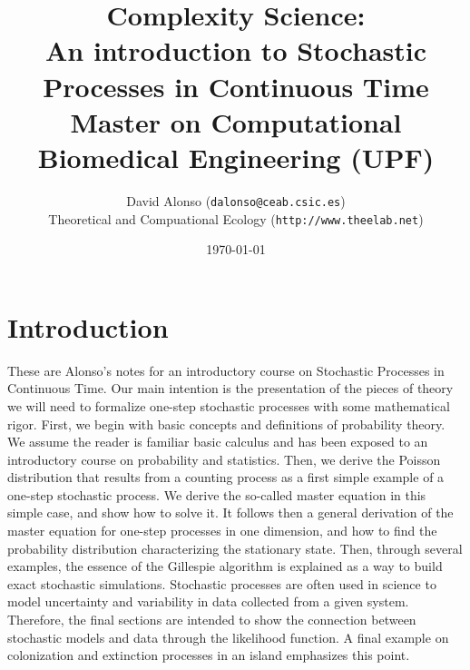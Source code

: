 \documentclass{article}
\begin{document}
\title{Complexity Science: \\ An introduction to Stochastic Processes in Continuous Time \\ Master on Computational Biomedical Engineering (UPF)} %
\author{David Alonso ({\tt dalonso@ceab.csic.es}) \\ Theoretical and Compuational Ecology ({\tt http://www.theelab.net})} %
\date{\today} %

\maketitle

\newcommand{\ruby}[1]{\todo[color=green!40]{#1 - Ruby}}
\newcommand{\studentX}[1]{\todo[color=green!40]{#1 - studentX}} %
\newcommand{\vicente}[1]{\todo[color=purple!40]{#1 - vicente}}
\newcommand{\david}[1]{\todo[color=yellow]{#1 - david}}

\section{Introduction}
These are Alonso's notes for an introductory course on Stochastic Processes in Continuous Time. Our main intention is the presentation of the pieces of theory we will need to formalize one-step stochastic processes with some mathematical rigor. First, we begin with basic concepts and definitions of probability theory. We assume the reader is familiar basic calculus and has been exposed to an introductory course on probability and statistics. Then, we derive the Poisson distribution that results from a counting process as a first simple example of a one-step stochastic process. We derive the so-called master equation in this simple case, and show how to solve it. It follows then a general derivation of the master equation for one-step processes in one dimension, and how to find the probability distribution characterizing the stationary state. Then, through several examples, the essence of the Gillespie algorithm is explained as a way to build exact stochastic simulations. Stochastic processes are often used in science to model uncertainty and variability in data collected from a given system. Therefore, the final sections are intended to show the connection between stochastic models and data through the likelihood function. A final example on colonization and extinction processes in an island emphasizes this point.
\smallskip
\end{document}
